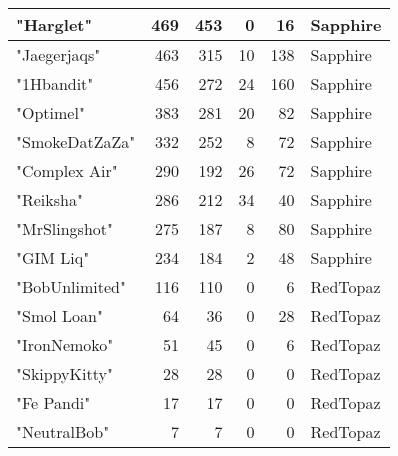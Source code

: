 \documentclass{article}
\begin{document}
\begin{table}[htbp]
\begin{tabular}{|l|r|r|r|r|l|}
"Harglet" & 469 & 453 & 0 & 16 & Sapphire \\ \hline
"Jaegerjaqs" & 463 & 315 & 10 & 138 & Sapphire \\ \hline
"1Hbandit" & 456 & 272 & 24 & 160 & Sapphire \\ \hline
"Optimel" & 383 & 281 & 20 & 82 & Sapphire \\ \hline
"SmokeDatZaZa" & 332 & 252 & 8 & 72 & Sapphire \\ \hline
"Complex Air" & 290 & 192 & 26 & 72 & Sapphire \\ \hline
"Reiksha" & 286 & 212 & 34 & 40 & Sapphire \\ \hline
"MrSlingshot" & 275 & 187 & 8 & 80 & Sapphire \\ \hline
"GIM Liq" & 234 & 184 & 2 & 48 & Sapphire \\ \hline
"BobUnlimited" & 116 & 110 & 0 & 6 & RedTopaz \\ \hline
"Smol Loan" & 64 & 36 & 0 & 28 & RedTopaz \\ \hline
"IronNemoko" & 51 & 45 & 0 & 6 & RedTopaz \\ \hline
"SkippyKitty" & 28 & 28 & 0 & 0 & RedTopaz \\ \hline
"Fe Pandi" & 17 & 17 & 0 & 0 & RedTopaz \\ \hline
"NeutralBob" & 7 & 7 & 0 & 0 & RedTopaz \\ \hline
\end{tabular}
\end{table}
\end{document}
